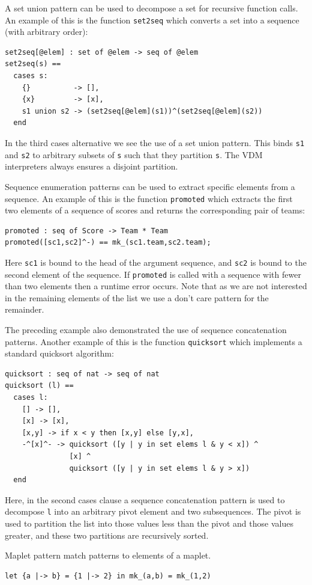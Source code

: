 \documentclass{overturerepchap}
\begin{document}
\begin{description}
A set union pattern can be used to decompose a set for recursive
function calls. An example of this is the function \texttt{set2seq}
which converts a set into a sequence (with arbitrary order):
\begin{lstlisting}
set2seq[@elem] : set of @elem -> seq of @elem
set2seq(s) ==
  cases s:
    {}          -> [],
    {x}         -> [x],
    s1 union s2 -> (set2seq[@elem](s1))^(set2seq[@elem](s2))
  end
\end{lstlisting}
In the third cases alternative we see the use of a set union pattern. This
binds \texttt{s1} and \texttt{s2} to arbitrary subsets of \texttt{s}
such that they partition \texttt{s}. The VDM interpreters always
ensures a disjoint partition.

Sequence enumeration patterns can be used to extract specific elements
from a sequence. An example of this is the function \texttt{promoted}
which extracts the first two elements of a sequence of scores and
returns the corresponding pair of teams:
\begin{lstlisting}
promoted : seq of Score -> Team * Team
promoted([sc1,sc2]^-) == mk_(sc1.team,sc2.team);
\end{lstlisting}
Here \texttt{sc1} is bound to the head of the argument sequence, and
\texttt{sc2} is bound to the second element of the sequence. If
\texttt{promoted} is called with a sequence with fewer than two
elements then a runtime error occurs. Note that as we are not
interested in the remaining elements of the list we use a don't care
pattern for the remainder. 

The preceding example also demonstrated the use of sequence
concatenation patterns. Another example of this is the function
\texttt{quicksort} which implements a standard quicksort algorithm:
\begin{lstlisting}
quicksort : seq of nat -> seq of nat
quicksort (l) ==
  cases l:
    [] -> [],
    [x] -> [x],
    [x,y] -> if x < y then [x,y] else [y,x],
    -^[x]^- -> quicksort ([y | y in set elems l & y < x]) ^ 
               [x] ^
               quicksort ([y | y in set elems l & y > x])
  end
\end{lstlisting}
Here, in the second cases clause a sequence concatenation pattern is
used to decompose \texttt{l} into an arbitrary pivot element and two
subsequences. The pivot is used to partition the list into those
values less than the pivot and those values greater, and these two
partitions are recursively sorted.


Maplet pattern match patterns to elements of a maplet.
\begin{lstlisting}
let {a |-> b} = {1 |-> 2} in mk_(a,b) = mk_(1,2)
\end{lstlisting}


\end{description}
\end{document}
